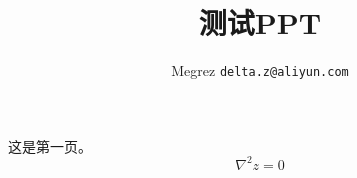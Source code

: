 \documentclass[12pt]{beamer}
\title{测试PPT}
\author[del2z]{Megrez \texttt{delta.z@aliyun.com}}
\begin{document}
\begin{frame}
\titlepage
\end{frame}

\begin{frame}
这是第一页。
\begin{equation}
  \nabla^2 z = 0
\end{equation}
\end{frame}
\end{document}
